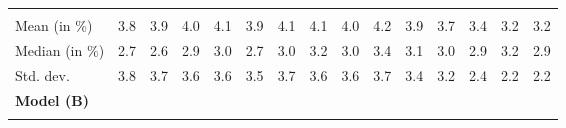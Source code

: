 \begin{tabular}{lllllllllllllll}
  \multicolumn{1}{|r}{} &
  \multicolumn{1}{r}{} &
  \multicolumn{1}{r}{} &
  \multicolumn{1}{r}{} &
  \multicolumn{1}{r}{} &
  \multicolumn{1}{r}{} &
  \multicolumn{1}{r}{} &
  \multicolumn{1}{r}{} &
  \multicolumn{1}{r}{} &
  \multicolumn{1}{r}{} &
  \multicolumn{1}{r}{} &
  \multicolumn{1}{r}{} &
  \multicolumn{1}{r}{} &
  \multicolumn{1}{r}{} \\
\multicolumn{1}{l}{\hspace{2em}Mean (in $\%$)} &
  \multicolumn{1}{|r}{3.8} &
  \multicolumn{1}{r}{3.9} &
  \multicolumn{1}{r}{4.0} &
  \multicolumn{1}{r}{4.1} &
  \multicolumn{1}{r}{3.9} &
  \multicolumn{1}{r}{4.1} &
  \multicolumn{1}{r}{4.1} &
  \multicolumn{1}{r}{4.0} &
  \multicolumn{1}{r}{4.2} &
  \multicolumn{1}{r}{3.9} &
  \multicolumn{1}{r}{3.7} &
  \multicolumn{1}{r}{3.4} &
  \multicolumn{1}{r}{3.2} &
  \multicolumn{1}{r}{3.2} \\
\multicolumn{1}{l}{\hspace{2em}Median (in $\%$)} &
  \multicolumn{1}{|r}{2.7} &
  \multicolumn{1}{r}{2.6} &
  \multicolumn{1}{r}{2.9} &
  \multicolumn{1}{r}{3.0} &
  \multicolumn{1}{r}{2.7} &
  \multicolumn{1}{r}{3.0} &
  \multicolumn{1}{r}{3.2} &
  \multicolumn{1}{r}{3.0} &
  \multicolumn{1}{r}{3.4} &
  \multicolumn{1}{r}{3.1} &
  \multicolumn{1}{r}{3.0} &
  \multicolumn{1}{r}{2.9} &
  \multicolumn{1}{r}{3.2} &
  \multicolumn{1}{r}{2.9} \\
\multicolumn{1}{l}{\hspace{2em}Std. dev.} &
  \multicolumn{1}{|r}{3.8} &
  \multicolumn{1}{r}{3.7} &
  \multicolumn{1}{r}{3.6} &
  \multicolumn{1}{r}{3.6} &
  \multicolumn{1}{r}{3.5} &
  \multicolumn{1}{r}{3.7} &
  \multicolumn{1}{r}{3.6} &
  \multicolumn{1}{r}{3.6} &
  \multicolumn{1}{r}{3.7} &
  \multicolumn{1}{r}{3.4} &
  \multicolumn{1}{r}{3.2} &
  \multicolumn{1}{r}{2.4} &
  \multicolumn{1}{r}{2.2} &
  \multicolumn{1}{r}{2.2} \\
\multicolumn{1}{l}{{\textbf{Model (B)}}} &
  \multicolumn{1}{|r}{} &
  \multicolumn{1}{r}{} &
  \multicolumn{1}{r}{} &
  \multicolumn{1}{r}{} &
  \multicolumn{1}{r}{} &
  \multicolumn{1}{r}{} &
  \multicolumn{1}{r}{} &
  \multicolumn{1}{r}{} &
  \multicolumn{1}{r}{} &
  \multicolumn{1}{r}{} &
  \multicolumn{1}{r}{} &
  \multicolumn{1}{r}{} &
  \multicolumn{1}{r}{} &
  \multicolumn{1}{r}{} \\
\multicolumn{1}{l}{\hspace{1em}{\textit{Mult. term} ($\widehat{\tau}^{adv}$)}} &
  \multicolumn{1}{|r}{} &
  \multicolumn{1}{r}{} &
  \multicolumn{1}{r}{} &
  \multicolumn{1}{r}{} &

\end{tabular}
